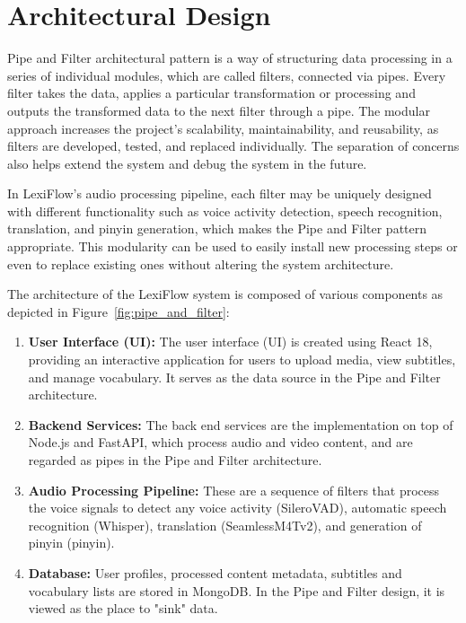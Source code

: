 \documentclass[oneside]{utmthesis}
\begin{document}
\section{Architectural Design}

Pipe and Filter architectural pattern is a way of structuring data processing in a series of individual modules, which are called filters, connected via pipes. Every filter takes the data, applies a particular transformation or processing and outputs the transformed data to the next filter through a pipe. The modular approach increases the project's scalability, maintainability, and reusability, as filters are developed, tested, and replaced individually. The separation of concerns also helps extend the system and debug the system in the future.

In LexiFlow's audio processing pipeline, each filter may be uniquely designed with different functionality such as voice activity detection, speech recognition, translation, and pinyin generation, which makes the Pipe and Filter pattern appropriate. This modularity can be used to easily install new processing steps or even to replace existing ones without altering the system architecture.

The architecture of the LexiFlow system is composed of various components as depicted in Figure~\ref{fig:pipe_and_filter}:


\begin{enumerate}[label= (\alph*)]
    \item \textbf{User Interface (UI):} The user interface (UI) is created using React 18, providing an interactive application for users to upload media, view subtitles, and manage vocabulary. It serves as the data source in the Pipe and Filter architecture.
    \item \textbf{Backend Services:} The back end services are the implementation on top of Node.js and FastAPI, which process audio and video content, and are regarded as pipes in the Pipe and Filter architecture.
    \item \textbf{Audio Processing Pipeline:} These are a sequence of filters that process the voice signals to detect any voice activity (SileroVAD), automatic speech recognition (Whisper), translation (SeamlessM4Tv2), and generation of pinyin (pinyin).
    \item \textbf{Database:} User profiles, processed content metadata, subtitles and vocabulary lists are stored in MongoDB. In the Pipe and Filter design, it is viewed as the place to "sink" data.
\end{enumerate}
\end{document}
